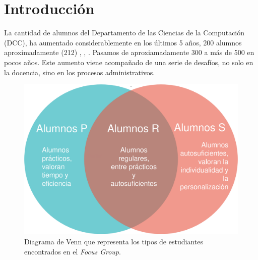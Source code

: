 \chapter{Introducción}\label{chap:intro}

    \par La cantidad de alumnos del Departamento de las Ciencias de la Computación (DCC), ha aumentado considerablemente en los últimos 5 años, 200 alumnos aproximadamente (212) \cite{CADCC2016}, \cite{CaDCC2018}, \cite{CADCC2021}. Pasamos de aproxiamadamente 300 a más de 500 en pocos años. Este aumento viene acompañado de una serie de desafíos, no solo en la docencia, sino en los procesos administrativos. 

    \begin{figure}[h]
        \centering
        \includegraphics[scale=0.2]{media/imagenes/focus_groups/Tipos_de_alumnos-Diagrama_de_Venn.png}
        \caption[Diagrama Tipos de alumnos]{Diagrama de Venn que representa los tipos de estudiantes encontrados en el \textit{Focus Group}.}
        \label{fig:alumnosVenn}
    \end{figure}


